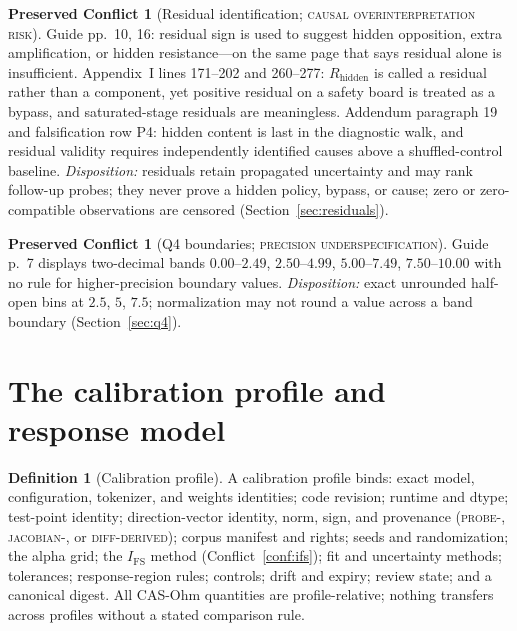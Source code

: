 \documentclass[11pt]{amsart}
\theoremstyle{definition}
\newtheorem{definition}[theorem]{Definition}
\newtheorem{conflict}[theorem]{Preserved Conflict}
\theoremstyle{remark}
\begin{document}
\begin{conflict}[Residual identification; \textnormal{\textsc{causal overinterpretation risk}}]\label{conf:residual}
Guide pp.~10, 16: residual sign is used to suggest hidden opposition, extra amplification, or hidden resistance---on the same page that says residual alone is insufficient. Appendix~I lines 171--202 and 260--277: $R_{\mathrm{hidden}}$ is called a residual rather than a component, yet positive residual on a safety board is treated as a bypass, and saturated-stage residuals are meaningless. Addendum paragraph 19 and falsification row P4: hidden content is last in the diagnostic walk, and residual validity requires independently identified causes above a shuffled-control baseline. \emph{Disposition:} residuals retain propagated uncertainty and may rank follow-up probes; they never prove a hidden policy, bypass, or cause; zero or zero-compatible observations are censored (Section~\ref{sec:residuals}).
\end{conflict}

\begin{conflict}[Q4 boundaries; \textnormal{\textsc{precision underspecification}}]\label{conf:q4}
Guide p.~7 displays two-decimal bands $0.00$--$2.49$, $2.50$--$4.99$, $5.00$--$7.49$, $7.50$--$10.00$ with no rule for higher-precision boundary values. \emph{Disposition:} exact unrounded half-open bins at $2.5$, $5$, $7.5$; normalization may not round a value across a band boundary (Section~\ref{sec:q4}).
\end{conflict}

\section{The calibration profile and response model}\label{sec:model}

\begin{definition}[Calibration profile]\label{def:profile}
A calibration profile binds: exact model, configuration, tokenizer, and weights identities; code revision; runtime and dtype; test-point identity; direction-vector identity, norm, sign, and provenance (\textsc{probe-}, \textsc{jacobian-}, or \textsc{diff-derived}); corpus manifest and rights; seeds and randomization; the alpha grid; the $I_{\mathrm{FS}}$ method (Conflict~\ref{conf:ifs}); fit and uncertainty methods; tolerances; response-region rules; controls; drift and expiry; review state; and a canonical digest. All CAS-Ohm quantities are profile-relative; nothing transfers across profiles without a stated comparison rule.
\end{definition}
\end{document}

